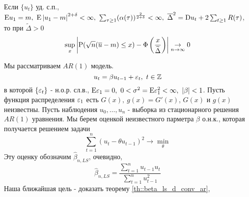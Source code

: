 \begin{corollary}
    Если $\{u_t\}$ уд. с.п., $\E u_1=m,\ \E\left\lvert u_1-m\right\rvert ^{2+\delta}<\infty,\ \sum_{\tau\geq1}(\alpha(\tau))^{\frac{2}{2+\delta}}<\infty,\ \overline{\Delta}^2=\D u_t+2\sum_{t\geq1}R(\tau)$,
    то при  $\widetilde{\Delta}>0$
    \[\sup_{x}\left\lvert \P(\sqrt{n}(\overline{u}-m)\leq x)-\Phi\left(\frac{x}{\widetilde{\Delta}}\right)\right\rvert \underset{n\rightarrow\infty}{\rightarrow}0\]
\end{corollary}

\newpage
Мы рассматриваем $AR(1)$ модель.
\begin{equation} \label{eq::new_ar_equation}
    u_t=\beta u_{t-1}+\eps_t,\ t\in\Z
\end{equation}
в которой $\{\eps_t\}$ - н.о.р. сл.в., $\E\eps_1=0,\ 0<\sigma^2=\E\eps_1^2<\infty,\ \left\lvert \beta\right\rvert <1$.
Пусть функция распределения $\eps_1$ есть $G(x),\ g(x)=G'(x)$, $G(x)$ и $g(x)$ неизвестны.
Пусть наблюдения $u_0,\ldots,u_n$ - выборка из стационарного решения $AR(1)$ уравнения.
Мы берем оценкой неизвестного парметра $\beta$ о.н.к., которая получается решением задачи
\[\sum_{t=1}^n(u_t-\theta u_{t-1})^2\rightarrow\min_{\theta}\]
Эту оценку обозначим $\widehat{\beta}_{n,LS}$, очевидно,
\begin{equation} \label{eq::ls_frac_repr} \tag{18'}
    \widehat{\beta}_{n,LS}=\frac{\sum_{t=1}^nu_{t-1}u_t}{\sum_{t=1}^nu_{t-1}^2}
\end{equation}
Наша ближайшая цель - доказать теорему \ref{th::beta_ls_d_conv_ar},

